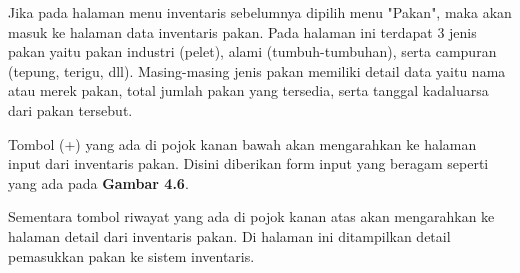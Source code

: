 \begin{spacing}{1.5}
	Jika pada halaman menu inventaris sebelumnya dipilih menu "Pakan", maka akan masuk ke halaman data inventaris pakan. Pada halaman ini terdapat 3 jenis pakan yaitu pakan industri (pelet), alami (tumbuh-tumbuhan), serta campuran (tepung, terigu, dll). Masing-masing jenis pakan memiliki detail data yaitu nama atau merek pakan, total jumlah pakan yang tersedia, serta tanggal kadaluarsa dari pakan tersebut.

	Tombol (+) yang ada di pojok kanan bawah akan mengarahkan ke halaman input dari inventaris pakan. Disini diberikan form input yang beragam seperti yang ada pada \textbf{Gambar 4.6}.

	Sementara tombol riwayat yang ada di pojok kanan atas akan mengarahkan ke halaman detail dari inventaris pakan. Di halaman ini ditampilkan detail pemasukkan pakan ke sistem inventaris.


\end{spacing}
